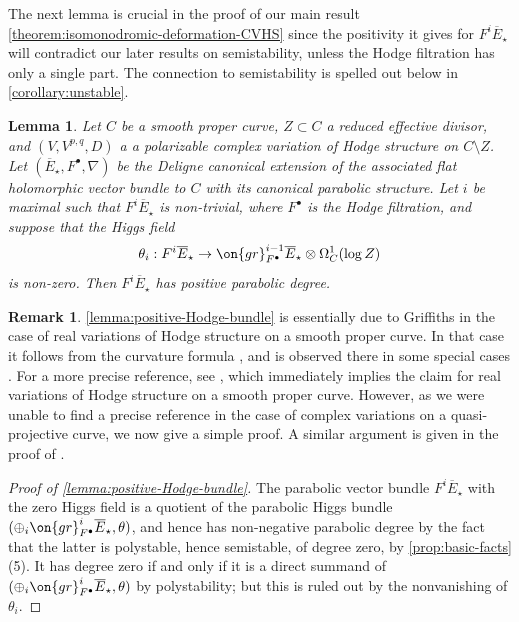 \documentclass[12 pt]{amsart}
\theoremstyle{plain}
\newtheorem{lemma}[subsubsection]{Lemma}
\theoremstyle{definition}
\newtheorem{remark}[subsubsection]{Remark}
\theoremstyle{remark}
\numberwithin{equation}{section}
\begin{document}
The next lemma is crucial in the proof of our main result
\autoref{theorem:isomonodromic-deformation-CVHS} since the positivity it
gives for $F^i \overline{E}_\star$ will contradict our later results on
semistability, unless the Hodge filtration has only a single part.
The connection to semistability is spelled out below in
\autoref{corollary:unstable}.
\begin{lemma}\label{lemma:positive-Hodge-bundle}
    Let $C$ be a smooth proper curve, $Z\subset C$ a reduced effective divisor,
    and $(V, V^{p,q}, D)$ a  a polarizable complex variation of Hodge structure
    on $C\setminus Z$. Let $(\overline{E}_\star, F^\bullet, \nabla)$ be the Deligne canonical
    extension of the associated flat holomorphic vector bundle to $C$ with its
    canonical parabolic structure.  Let $i$ be maximal such that
    $F^i\overline{E}_\star$ is non-trivial, where $F^\bullet$ is the Hodge
    filtration, and suppose that the Higgs field $$\theta_i:
    F^i\overline{E}_\star\to
    \on{gr}^{i-1}_{F^{\bullet}}\overline{E}_\star\otimes \Omega^1_C(\log Z)$$ is
    non-zero. Then $F^i\overline{E}_\star$ has positive parabolic degree.
\end{lemma}
\begin{remark}
	\label{remark:}
	\autoref{lemma:positive-Hodge-bundle} is essentially due to Griffiths in the case of real variations of
	Hodge structure on a
	smooth proper curve. In that case it follows from the curvature formula \cite[Theorem
	5.2]{griffiths1970periods}, and is observed there in some special cases
	\cite[Corollary 7.10]{griffiths1970periods}. For a more precise
	reference, see \cite[Corollary 2.2]{peters2000arakelov}, which
	immediately implies the claim for real variations of Hodge structure on a smooth proper curve. 
	However, as we were unable to find a precise reference in the case of complex
	variations on a quasi-projective curve, we now give a simple proof.
	A similar argument is given in the proof of 
	\cite[Theorem 3.8]{esnaultK:d-modules-and-finite-monodromy}.
\end{remark}
\begin{proof}[Proof of \autoref{lemma:positive-Hodge-bundle}]
The parabolic vector bundle $F^i\overline{E}_\star$ with the zero Higgs field is a quotient of
the parabolic Higgs bundle  $(\oplus_i \on{gr}^i_{F^\bullet}\overline{E}_\star, \theta)$, and
hence has non-negative parabolic degree by the fact that the latter is polystable, hence semistable, of
degree zero, by \autoref{prop:basic-facts}(5). It has degree zero if and only if
it is a direct summand of $(\oplus_i \on{gr}^i_{F^\bullet}\overline{E}_\star, \theta)$ by polystability; but this is ruled out by the nonvanishing of $\theta_i$.
\end{proof}
\end{document}

